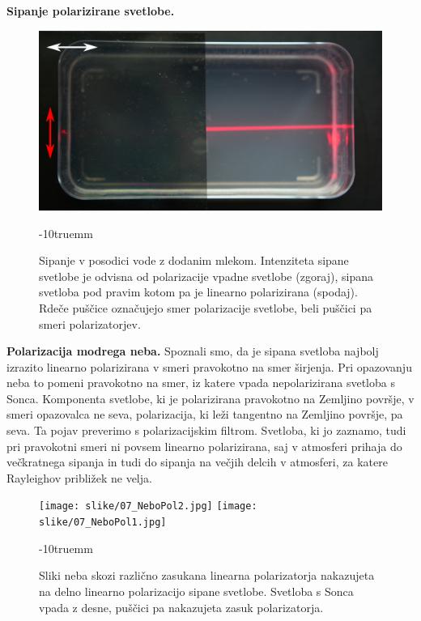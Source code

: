 \begin{example}{\bf Sipanje polarizirane svetlobe.}
\begin{figure}[!h]
\includegraphics[width=7truecm]{slike/07_Mleko4.jpg}
\caption{Sipanje v posodici vode z dodanim mlekom. Intenziteta sipane svetlobe je odvisna 
od polarizacije vpadne svetlobe (zgoraj), sipana svetloba pod pravim kotom pa je linearno
polarizirana (spodaj). Rdeče puščice označujejo smer polarizacije svetlobe, beli puščici
pa smeri polarizatorjev.}
\label{fig:07_mleko}
\vglue-10truemm
\end{figure}

\end{example}

\begin{example}{\bf Polarizacija modrega neba.}
Spoznali smo, da je sipana svetloba najbolj izrazito linearno polarizirana v smeri pravokotno na smer 
širjenja. Pri opazovanju neba to pomeni pravokotno na smer, iz katere vpada nepolarizirana 
svetloba s Sonca. Komponenta svetlobe, ki je polarizirana pravokotno na Zemljino površje, 
v smeri opazovalca ne seva, polarizacija, ki leži tangentno na Zemljino površje, pa seva. Ta
pojav preverimo s polarizacijskim filtrom. Svetloba, ki jo zaznamo, tudi pri pravokotni smeri
ni povsem linearno polarizirana, saj v atmosferi prihaja do večkratnega sipanja in tudi do 
sipanja na večjih delcih v atmosferi, za katere Rayleighov približek ne velja.
\begin{figure}[!h]
\centering
\texttt{[image: slike/07\_NeboPol2.jpg]}\hfill
\texttt{[image: slike/07\_NeboPol1.jpg]}
\caption{Sliki neba skozi različno zasukana linearna polarizatorja nakazujeta na delno
linearno polarizacijo sipane svetlobe. Svetloba s Sonca vpada z desne, puščici pa nakazujeta
zasuk polarizatorja.}
\label{fig:07_NeboPol}
\vglue-10truemm
\end{figure}

\end{example}

